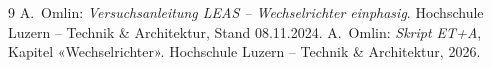 \documentclass[a4paper,11pt]{scrartcl}
\begin{document}
\begin{thebibliography}{9}
   A.~Omlin: \emph{Versuchsanleitung LEAS -- Wechselrichter einphasig}. Hochschule Luzern -- Technik \& Architektur, Stand 08.11.2024.
   A.~Omlin: \emph{Skript ET+A}, Kapitel «Wechselrichter». Hochschule Luzern -- Technik \& Architektur, 2026.
\end{thebibliography}
\end{document}
